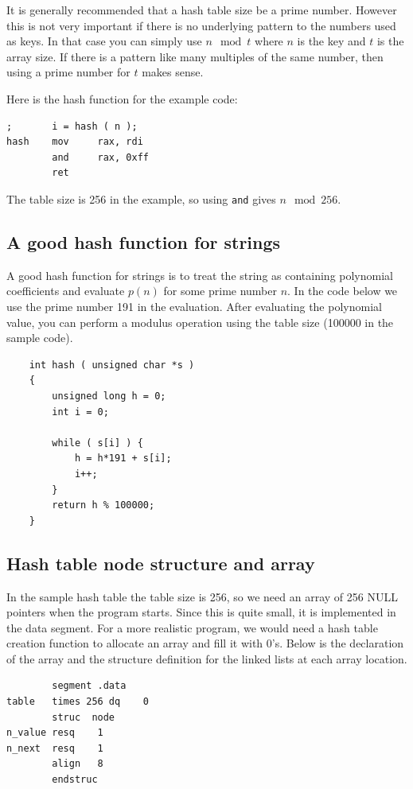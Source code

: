 \documentclass[11pt,b5paper]{book}
\begin{document}
It is generally recommended that a hash table size be a prime number.
However this is not very important if there is no underlying pattern
to the numbers used as keys.
In that case you can simply use $n \mod t$ where $n$ is the key and
$t$ is the array size.
If there is a pattern like many multiples of the same number, then
using a prime number for $t$ makes sense.

Here is the hash function for the example code:
\begin{verbatim}
;       i = hash ( n );
hash    mov     rax, rdi
        and     rax, 0xff
        ret
\end{verbatim}
The table size is 256 in the example, so using {\tt and} gives $n \mod 256$.


\subsection{A good hash function for strings}

A good hash function for strings is to treat the string as containing polynomial coefficients and evaluate $p(n)$ for some prime number $n$.
In the code below we use the prime number 191 in the evaluation.
After evaluating the polynomial value, you can perform a modulus operation using the table size (100000 in the sample code).
\begin{verbatim}
    int hash ( unsigned char *s )
    {
        unsigned long h = 0;
        int i = 0;
        
        while ( s[i] ) {
            h = h*191 + s[i];
            i++;
        }
        return h % 100000;
    }
\end{verbatim}

\subsection{Hash table node structure and array}

In the sample hash table the table size is 256, so we need an array
of 256 NULL pointers when the program starts.
Since this is quite small, it is implemented in the data segment.
For a more realistic program, we would need a hash table creation
function to allocate an array and fill it with 0's.
Below is the declaration of the array and the structure definition
for the linked lists at each array location.

\begin{verbatim}
        segment .data
table   times 256 dq    0
        struc  node
n_value resq    1
n_next  resq    1
        align   8
        endstruc
\end{verbatim}
\end{document}
